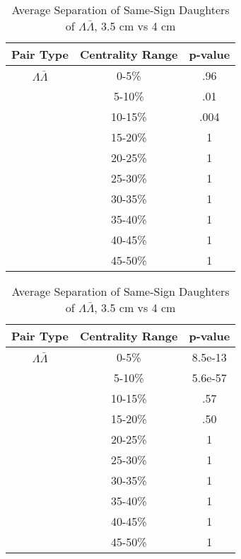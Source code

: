\begin{table}
\begin{minipage}{18pc}
\caption{Average Separation of Same-Sign Daughters of $\Lambda\bar{\Lambda}$, 3.5 cm vs 3 cm} \label{tab:AvgSepProtDaughters35cmVs3cm}
\begin{center}
\begin{tabular}{| c | c | c |}
  \hline                       
  Pair Type & Centrality Range & p-value \\
   \hline
  $\Lambda\bar{\Lambda}$ &  0-5\% & .96 \\
   & 5-10\% & .01 \\
   & 10-15\% & .004 \\
   & 15-20\% & 1 \\
   & 20-25\% & 1 \\
   & 25-30\% & 1 \\
   & 30-35\% & 1 \\
   & 35-40\% & 1 \\
   & 40-45\% & 1 \\
   & 45-50\% & 1 \\
  \hline  
\end{tabular}
\end{center}
\end{minipage}
\begin{minipage}{18pc}
\caption{Average Separation of Same-Sign Daughters of $\Lambda\bar{\Lambda}$, 3.5 cm vs 4 cm} \label{tab:AvgSepProtDaughters35cmVs4cm}
\begin{center}
\begin{tabular}{| c | c | c |}
  \hline                       
  Pair Type & Centrality Range & p-value \\
   \hline
  $\Lambda\bar{\Lambda}$ &  0-5\% & 8.5e-13 \\
   & 5-10\% & 5.6e-57 \\
   & 10-15\% & .57 \\
   & 15-20\% & .50 \\
   & 20-25\% & 1 \\
   & 25-30\% & 1 \\
   & 30-35\% & 1 \\
   & 35-40\% & 1 \\
   & 40-45\% & 1 \\
   & 45-50\% & 1 \\
  \hline  
\end{tabular}
\end{center}
\end{minipage}
\end{table}



